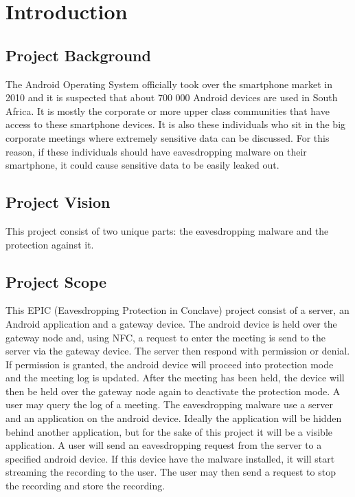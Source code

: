\documentclass[a4paper,12pt,titlepage]{article}
\begin{document}
	
	
	\newpage
	\tableofcontents
	\newpage
	\section{Introduction}
		\subsection{Project Background}

The Android Operating System officially took over the smartphone market in 2010 and it is suspected that about 700 000 Android devices are used in South Africa. It is mostly the corporate or more upper class communities that have access to these smartphone devices. It is also these individuals who sit in the big corporate meetings where extremely sensitive data can be discussed. For this reason, if these individuals should have eavesdropping malware on their smartphone, it could cause sensitive data to be easily leaked out.


		\subsection{Project Vision}
This project consist of two unique parts: the eavesdropping malware and the protection against it.
		\subsection{Project Scope}
This EPIC (Eavesdropping Protection in Conclave) project consist of a server, an Android application and a gateway device. The android device is held over the gateway node and, using NFC, a request to enter the meeting is send to the server via the gateway device. The server then respond with permission or denial. If permission is granted, the android device will proceed into protection mode and the meeting log is updated. After the meeting has been held, the device will then be held over the gateway node again to deactivate the protection mode. A user may query the log of a meeting.
\newline
The eavesdropping malware use a server and an application on the android device. Ideally the application will be hidden behind another application, but for the sake of this project it will be a visible application. A user will send an eavesdropping request from the server to a specified android device. If this device have the malware installed, it will start streaming the recording to the user. The user may then send a request to stop the recording and store the recording.
\end{document}
